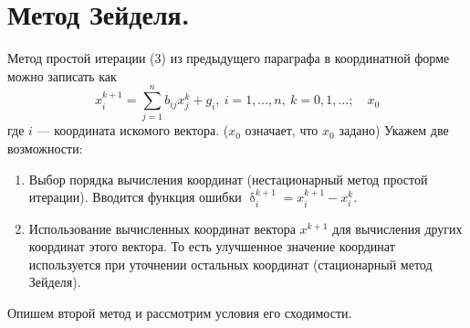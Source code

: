 \documentclass[a4paper, 12pt]{report}
\renewcommand{\delta}{\updelta}
\begin{document}
	\section{Метод Зейделя.}
	Метод простой итерации (3) из предыдущего параграфа в координатной форме можно записать как $$x_i^{k+1} = \sum_{j=1}^{n} b_{ij}x^k_j + g_i,\ i=1,\ldots,n,\ k = 0,1,\ldots;\quad x_0$$
	где $i$ --- координата искомого вектора. ($x_0$ означает, что $x_0$ задано) Укажем две возможности:
	\begin{enumerate}
		\item Выбор порядка вычисления координат (нестационарный метод простой итерации).
		Вводится функция ошибки $\delta_i^{k+1} = x_i^{k+1} - x_i^k.$
		\item Использование вычисленных координат вектора $x^{k+1}$ для вычисления других координат этого вектора. То есть улучшенное значение координат используется при уточнении остальных координат (стационарный метод Зейделя).
	\end{enumerate}
	Опишем второй метод и рассмотрим условия его сходимости.
\end{document}
